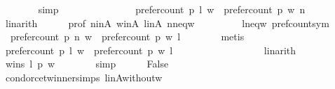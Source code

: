 \begin{isabellebody}
\ \ \ \ \ \ \isamarkupfalse%
\ simp\isanewline
\ \ \ \ \isamarkupfalse%
\ {}{}{}\ {}{}{}\ {}{}{}\isanewline
\ \ \ \ \isamarkupfalse%
\ {}{}{}{\isacharcolon}{\kern0pt}\ {\isachardoublequoteopen}prefer{\isacharunderscore}{\kern0pt}count\ p\ l\ w\ {\isasymge}\ prefer{\isacharunderscore}{\kern0pt}count\ p\ w\ n{\isachardoublequoteclose}\isanewline
\ \ \ \ \ \ \isamarkupfalse%
\ linarith\isanewline
\ \ \ \ \isamarkupfalse%
\ prof\ n{\isacharunderscore}{\kern0pt}in{\isacharunderscore}{\kern0pt}A\ w{\isacharunderscore}{\kern0pt}in{\isacharunderscore}{\kern0pt}A\ l{\isacharunderscore}{\kern0pt}in{\isacharunderscore}{\kern0pt}A\ n{\isacharunderscore}{\kern0pt}neq{\isacharunderscore}{\kern0pt}w\isanewline
\ \ \ \ \ \ \ \ \ l{\isacharunderscore}{\kern0pt}neq{\isacharunderscore}{\kern0pt}w\ pref{\isacharunderscore}{\kern0pt}count{\isacharunderscore}{\kern0pt}sym\isanewline
\ \ \ \ \isamarkupfalse%
\ {}{}{}{\isacharcolon}{\kern0pt}\ {\isachardoublequoteopen}prefer{\isacharunderscore}{\kern0pt}count\ p\ n\ w\ {\isasymge}\ prefer{\isacharunderscore}{\kern0pt}count\ p\ w\ l{\isachardoublequoteclose}\isanewline
\ \ \ \ \ \ \isamarkupfalse%
\ metis\isanewline
\ \ \ \ \isamarkupfalse%
\ {\isachardoublequoteopen}prefer{\isacharunderscore}{\kern0pt}count\ p\ l\ w\ {\isachargreater}{\kern0pt}\ prefer{\isacharunderscore}{\kern0pt}count\ p\ w\ l{\isachardoublequoteclose}\isanewline
\ \ \ \ \ \ \isamarkupfalse%
\ {\isachardoublequoteopen}{}{}{}{\isachardoublequoteclose}\ {\isachardoublequoteopen}{}{}{}{\isachardoublequoteclose}\ {\isachardoublequoteopen}{}{}{}{\isachardoublequoteclose}\isanewline
\ \ \ \ \ \ \isamarkupfalse%
\ linarith\isanewline
\ \ \ \ \isamarkupfalse%
\ {\isachardoublequoteopen}wins\ l\ p\ w{\isachardoublequoteclose}\isanewline
\ \ \ \ \ \ \isamarkupfalse%
\ simp\isanewline
\ \ \ \ \isamarkupfalse%
\ False\isanewline
\ \ \ \ \ \ \isamarkupfalse%
\ condorcet{\isacharunderscore}{\kern0pt}winner{\isachardot}{\kern0pt}simps\ l{\isacharunderscore}{\kern0pt}in{\isacharunderscore}{\kern0pt}A{\isacharunderscore}{\kern0pt}without{\isacharunderscore}{\kern0pt}w\isanewline

\end{isabellebody}
